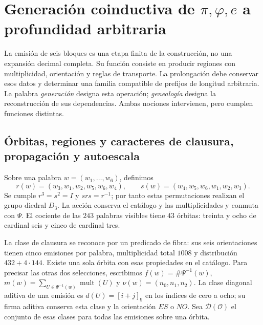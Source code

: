 \section{Generación coinductiva de \texorpdfstring{\(\pi,\varphi,e\)}{pi, phi, e} a profundidad arbitraria}
\label{x_reciprocidad:sec:generacion}

La emisión de seis bloques es una etapa finita de la construcción, no una expansión decimal completa. Su función consiste en producir regiones con multiplicidad, orientación y reglas de transporte. La prolongación debe conservar esos datos y determinar una familia compatible de prefijos de longitud arbitraria. La palabra \emph{generación} designa esta operación; \emph{genealogía} designa la reconstrucción de sus dependencias. Ambas nociones intervienen, pero cumplen funciones distintas.

\subsection{Órbitas, regiones y caracteres de clausura, propagación y autoescala}

Sobre una palabra \(w=(w_1,\ldots,w_6)\), definimos
\[
 r(w)=(w_3,w_1,w_2,w_5,w_6,w_4),\qquad
 s(w)=(w_4,w_5,w_6,w_1,w_2,w_3).
\]
Se cumple \(r^3=s^2=I\) y \(srs=r^{-1}\); por tanto estas permutaciones realizan el grupo diedral \(D_3\). La acción conserva el catálogo y las multiplicidades y conmuta con \(\Psi\). El cociente de las \(243\) palabras visibles tiene \(43\) órbitas: treinta y ocho de cardinal seis y cinco de cardinal tres.

La clase de clausura se reconoce por un predicado de fibra: sus seis orientaciones tienen cinco emisiones por palabra, multiplicidad total \(1008\) y distribución \(432+4\cdot144\). Existe una sola órbita con esas propiedades en el catálogo. Para precisar las otras dos selecciones, escribimos \(f(w)=\#\Psi^{-1}(w)\), \(m(w)=\sum_{U\in\Psi^{-1}(w)}\operatorname{mult}(U)\) y \(\nu(w)=(n_0,n_1,n_2)\). La clase diagonal aditiva de una emisión es \(d(U)=[i+j]_9\) en los índices de cero a ocho; su firma aditiva conserva esta clase y la orientación \(ES\) o \(NO\). Sea \(\mathcal D(\mathcal O)\) el conjunto de esas clases para todas las emisiones sobre una órbita.


